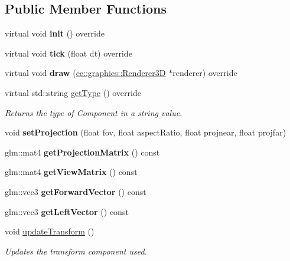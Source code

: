 \subsection*{Public Member Functions}
\begin{DoxyCompactItemize}
\item 
\mbox{\label{classce_1_1game_1_1_camera_component_a94cd29ec78e415f255691c35482d6870}} 
virtual void {\bfseries init} () override
\item 
\mbox{\label{classce_1_1game_1_1_camera_component_a5657dea10eefa5bc3e9ddb34f5cc34a9}} 
virtual void {\bfseries tick} (float dt) override
\item 
\mbox{\label{classce_1_1game_1_1_camera_component_ac47d4b1587a57452b611fafe35a3eaf2}} 
virtual void {\bfseries draw} (\hyperlink{classce_1_1graphics_1_1_renderer3_d}{ce\+::graphics\+::\+Renderer3D} $\ast$renderer) override
\item 
virtual std\+::string \hyperlink{classce_1_1game_1_1_camera_component_a15140bffd017245dd17ed9aa0f953a1b}{get\+Type} () override
\begin{DoxyCompactList}\small\item\em Returns the type of Component in a string value. \end{DoxyCompactList}\item 
\mbox{\label{classce_1_1game_1_1_camera_component_a07df0b85d75a8771727691377c9a4314}} 
void {\bfseries set\+Projection} (float fov, float aspect\+Ratio, float projnear, float projfar)
\item 
\mbox{\label{classce_1_1game_1_1_camera_component_ad439c496f134fcca9a1a232a34603c30}} 
glm\+::mat4 {\bfseries get\+Projection\+Matrix} () const
\item 
\mbox{\label{classce_1_1game_1_1_camera_component_ac6ef973b5d1b2722257c830fce9e858e}} 
glm\+::mat4 {\bfseries get\+View\+Matrix} () const
\item 
\mbox{\label{classce_1_1game_1_1_camera_component_a1768813779097844b1a55105b19e9509}} 
glm\+::vec3 {\bfseries get\+Forward\+Vector} () const
\item 
\mbox{\label{classce_1_1game_1_1_camera_component_aa36316887ec2a46098ac554e3e30610a}} 
glm\+::vec3 {\bfseries get\+Left\+Vector} () const
\item 
void \hyperlink{classce_1_1game_1_1_camera_component_a8c29ab156769194cc83908467b37beec}{update\+Transform} ()
\begin{DoxyCompactList}\small\item\em Updates the transform component used. \end{DoxyCompactList}\end{DoxyCompactItemize}
